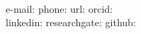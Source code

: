 
\newcommand\horizontalSpaceItems{8pt}

\begin{center}
    \textbf{\bioName}
    \bioHeader\\
    e-mail: \bioEmailUrl \hspace{\horizontalSpaceItems} phone: \bioPhoneUrl \hspace{\horizontalSpaceItems} url: \bioHomepageUrl \hspace{\horizontalSpaceItems} orcid: \bioOrcidUrl \\
    linkedin: \bioLinkedInUrl \hspace{\horizontalSpaceItems} researchgate: \bioResearchGateUrl \hspace{\horizontalSpaceItems} github: \bioGitHubUrl
    \\
    \hrulefill
\end{center}